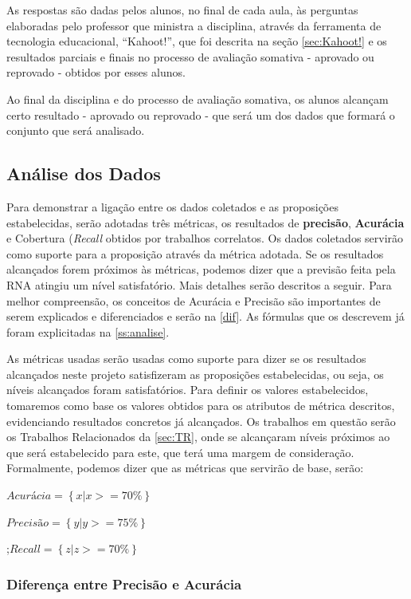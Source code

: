 As respostas são dadas pelos alunos, no final de cada aula, às perguntas elaboradas pelo professor que ministra a disciplina, através da ferramenta de tecnologia educacional, ``Kahoot!'', que foi descrita na seção \ref{sec:Kahoot!} e os resultados parciais e finais no processo de avaliação somativa - aprovado ou reprovado - obtidos por esses alunos.

Ao final da disciplina e do processo de avaliação somativa, os alunos alcançam certo resultado - aprovado ou reprovado - que será um dos dados que formará o conjunto que será analisado.

\subsection{Análise dos Dados}
Para demonstrar a ligação entre os dados coletados e as proposições estabelecidas, serão adotadas três métricas, os resultados de \textbf{precisão}, \textbf{Acurácia} e Cobertura (\textit{Recall} obtidos por trabalhos correlatos. Os dados coletados servirão como suporte para a proposição através da métrica adotada. Se os resultados alcançados forem próximos às métricas, podemos dizer que a previsão feita pela RNA atingiu um nível satisfatório. Mais detalhes serão descritos a seguir. Para melhor compreensão, os conceitos de Acurácia e Precisão são importantes de serem explicados e diferenciados e serão na \autoref{dif}. As fórmulas que os descrevem já foram explicitadas na \autoref{ss:analise}.

As métricas usadas serão usadas como suporte para dizer se os resultados alcançados neste projeto satisfizeram as proposições estabelecidas, ou seja, os níveis alcançados foram satisfatórios. Para definir os valores estabelecidos, tomaremos como base os valores obtidos para os atributos de métrica descritos, evidenciando resultados concretos já alcançados. Os trabalhos em questão serão os Trabalhos Relacionados da \autoref{sec:TR}, onde se alcançaram níveis próximos ao que será estabelecido para este, que terá uma margem de consideração. Formalmente, podemos dizer que as métricas que servirão de base, serão:

$Acurácia = \left \{ x | x >= 70\% \right \}$

$Precisão = \left \{ y | y >= 75\% \right \}$

;$Recall = \left \{ z | z >= 70\% \right \}$
\subsubsection{Diferença entre Precisão e Acurácia} \label{dif}

